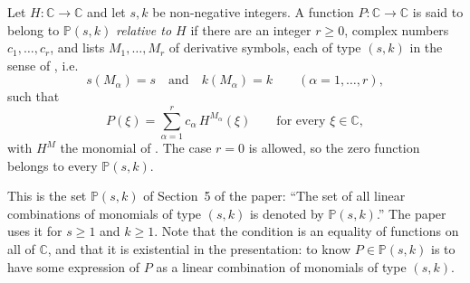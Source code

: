 \begin{definition}
Let $H\colon\mathbb{C}\to\mathbb{C}$ and let $s,k$ be non-negative integers.
A function $P\colon\mathbb{C}\to\mathbb{C}$ is said to belong to
$\mathbb{P}(s,k)$ \emph{relative to $H$} if there are an integer $r\ge0$,
complex numbers $c_1,\dots,c_r$, and lists $M_1,\dots,M_r$ of derivative
symbols, each of type $(s,k)$ in the sense of , i.e.
\[
  s(M_\alpha)=s\quad\text{and}\quad k(M_\alpha)=k\qquad(\alpha=1,\dots,r),
\]
such that
\[
  P(\xi)=\sum_{\alpha=1}^{r}c_\alpha\,H^{M_\alpha}(\xi)
  \qquad\text{for every }\xi\in\mathbb{C},
\]
with $H^{M}$ the monomial of .  The case $r=0$ is
allowed, so the zero function belongs to every $\mathbb{P}(s,k)$.

This is the set $\mathbb{P}(s,k)$ of Section~5 of the paper: ``The set of all
linear combinations of monomials of type $(s,k)$ is denoted by
$\mathbb{P}(s,k)$.''  The paper uses it for $s\ge1$ and $k\ge1$.  Note that
the condition is an equality of functions on all of $\mathbb{C}$, and that it
is existential in the presentation: to know $P\in\mathbb{P}(s,k)$ is to have
some expression of $P$ as a linear combination of monomials of type $(s,k)$.
\end{definition}
